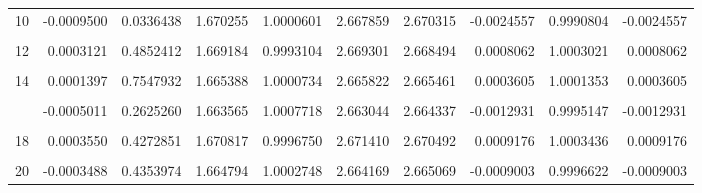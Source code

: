 \documentclass[a4paper]{tufte-handout}
\begin{document}
\begin{table}
{\begin{tabular}[t]{rrrrrrrrrr}
10 & -0.0009500 & 0.0336438 & 1.670255 & 1.0000601 & 2.667859 & 2.670315 & -0.0024557 & 0.9990804 & -0.0024557\\
\addlinespace
\cellcolor{gray!6}{11} & \cellcolor{gray!6}{-0.0004474} & \cellcolor{gray!6}{0.3170860} & \cellcolor{gray!6}{1.668672} & \cellcolor{gray!6}{0.9997065} & \cellcolor{gray!6}{2.667223} & \cellcolor{gray!6}{2.668379} & \cellcolor{gray!6}{-0.0011558} & \cellcolor{gray!6}{0.9995669} & \cellcolor{gray!6}{-0.0011558}\\
12 & 0.0003121 & 0.4852412 & 1.669184 & 0.9993104 & 2.669301 & 2.668494 & 0.0008062 & 1.0003021 & 0.0008062\\
\cellcolor{gray!6}{13} & \cellcolor{gray!6}{-0.0007914} & \cellcolor{gray!6}{0.0767747} & \cellcolor{gray!6}{1.663218} & \cellcolor{gray!6}{1.0007921} & \cellcolor{gray!6}{2.661968} & \cellcolor{gray!6}{2.664010} & \cellcolor{gray!6}{-0.0020422} & \cellcolor{gray!6}{0.9992334} & \cellcolor{gray!6}{-0.0020422}\\
14 & 0.0001397 & 0.7547932 & 1.665388 & 1.0000734 & 2.665822 & 2.665461 & 0.0003605 & 1.0001353 & 0.0003605\\
\cellcolor{gray!6}{15} & \cellcolor{gray!6}{-0.0000405} & \cellcolor{gray!6}{0.9278549} & \cellcolor{gray!6}{1.668708} & \cellcolor{gray!6}{0.9992771} & \cellcolor{gray!6}{2.667881} & \cellcolor{gray!6}{2.667985} & \cellcolor{gray!6}{-0.0001046} & \cellcolor{gray!6}{0.9999608} & \cellcolor{gray!6}{-0.0001046}\\
\addlinespace
16 & -0.0005011 & 0.2625260 & 1.663565 & 1.0007718 & 2.663044 & 2.664337 & -0.0012931 & 0.9995147 & -0.0012931\\
\cellcolor{gray!6}{17} & \cellcolor{gray!6}{-0.0006516} & \cellcolor{gray!6}{0.1450992} & \cellcolor{gray!6}{1.665783} & \cellcolor{gray!6}{0.9992144} & \cellcolor{gray!6}{2.663316} & \cellcolor{gray!6}{2.664997} & \cellcolor{gray!6}{-0.0016814} & \cellcolor{gray!6}{0.9993691} & \cellcolor{gray!6}{-0.0016814}\\
18 & 0.0003550 & 0.4272851 & 1.670817 & 0.9996750 & 2.671410 & 2.670492 & 0.0009176 & 1.0003436 & 0.0009176\\
\cellcolor{gray!6}{19} & \cellcolor{gray!6}{0.0005604} & \cellcolor{gray!6}{0.2102049} & \cellcolor{gray!6}{1.667328} & \cellcolor{gray!6}{1.0008842} & \cellcolor{gray!6}{2.669660} & \cellcolor{gray!6}{2.668212} & \cellcolor{gray!6}{0.0014478} & \cellcolor{gray!6}{1.0005426} & \cellcolor{gray!6}{0.0014478}\\
20 & -0.0003488 & 0.4353974 & 1.664794 & 1.0002748 & 2.664169 & 2.665069 & -0.0009003 & 0.9996622 & -0.0009003\\
\bottomrule
\end{tabular}}
\end{table}
\end{document}

